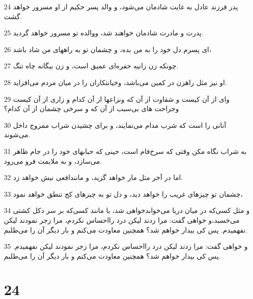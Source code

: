 \par 24 پدر فرزند عادل به غایت شادمان می‌شود، و والد پسر حکیم از او مسرور خواهد گشت.
\par 25 پدرت و مادرت شادمان خواهند شد، ووالده تو مسرور خواهد گردید.
\par 26 ‌ای پسرم دل خود را به من بده، و چشمان تو به راههای من شاد باشد،
\par 27 چونکه زن زانیه حفره‌ای عمیق است، و زن بیگانه چاه تنگ.
\par 28 او نیز مثل راهزن در کمین می‌باشد، وخیانتکاران را در میان مردم می‌افزاید.
\par 29 وای از آن کیست و شقاوت از آن که ونزاعها از آن کدام و زاری از آن کیست وجراحت های بی‌سبب از آن که و سرخی چشمان از آن کدام؟
\par 30 آنانی را است که شرب مدام می‌نمایند، و برای چشیدن شراب ممزوج داخل می‌شوند.
\par 31 به شراب نگاه مکن وقتی که سرخ‌فام است، حینی که حبابهای خود را در جام ظاهر می‌سازد، و به ملایمت فرو می‌رود.
\par 32 اما در آخر مثل مار خواهد گزید، و مانندافعی نیش خواهد زد.
\par 33 چشمان تو چیزهای غریب را خواهد دید، و دل تو به چیزهای کج تنطق خواهد نمود،
\par 34 و مثل کسی‌که در میان دریا می‌خوابدخواهی شد، یا مانند کسی‌که بر سر دکل کشتی می‌خسبد،و خواهی گفت: مرا زدند لیکن درد رااحساس نکردم، مرا زجر نمودند لیکن نفهمیدم. پس کی بیدار خواهم شد؟ همچنین معاودت می‌کنم و بار دیگر آن را می‌طلبم.
\par 35 و خواهی گفت: مرا زدند لیکن درد رااحساس نکردم، مرا زجر نمودند لیکن نفهمیدم. پس کی بیدار خواهم شد؟ همچنین معاودت می‌کنم و بار دیگر آن را می‌طلبم.
 
\chapter{24}

